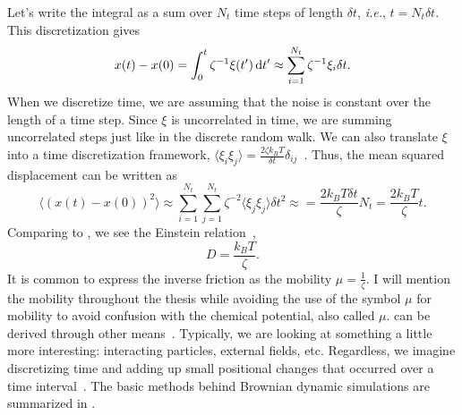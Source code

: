 Let's write the integral as a sum over $N_t$ time steps of length $\delta
t$, \textit{i.e.}, $t = N_t \delta t$. This discretization gives
%
\begin{equation}
  x(t) - x(0) =  \int_0^t \zeta^{-1} \xi(t') \mathop{}\!\mathrm{d} t' 
  \approx \sum_{i=1}^{N_t} \zeta^{-1} \xi_i \delta t.
\end{equation}
%
When we discretize time, we are assuming that the noise is constant over the
length of a time step. Since $\xi$ is uncorrelated in time, we are summing
uncorrelated steps just like in the discrete random walk. We can also translate
$\xi$ into a time discretization framework, $ \langle \xi_i \xi_j \rangle =
\frac{ 2 \zeta k_B T }{ \delta t} \delta_{ij}$~\cite{grassia_computer_95}.
Thus, the mean squared displacement can be written as
%
\begin{equation}
  \label{eqn:brownian_sum}
  \langle {(x(t) - x(0))}^2 \rangle 
  \approx \sum_{i=1}^{N_t} \sum_{j=1}^{N_t} 
  \zeta^{-2} \langle \xi_j \xi_j \rangle \delta t^2
  \approx = \frac{2 k_B T \delta t}{\zeta} N_t 
  =\frac{2 k_B T }{\zeta} t.
\end{equation}
%
Comparing  to , we see the Einstein
relation~\cite{einstein_uber_05},
%
\begin{equation}
  \label{eqn:einstein}
  D =\frac{k_B T }{\zeta}.
\end{equation}
%
It is common to express the inverse friction as the mobility $\mu =
\frac{1}{\zeta}$.  I will mention the mobility throughout the thesis while
avoiding the use of the symbol $\mu$ for mobility to avoid confusion with the
chemical potential, also called $\mu$.  can be derived
through other means~\cite{zwanzig_nonequilibrium_01, doi_theory_88}.  Typically,
we are looking at something a little more interesting: interacting particles,
external fields, etc.  Regardless, we imagine discretizing time and adding up
small positional changes that occurred over a time
interval~\cite{grassia_computer_95}.  The basic methods behind Brownian dynamic
simulations are summarized in .

